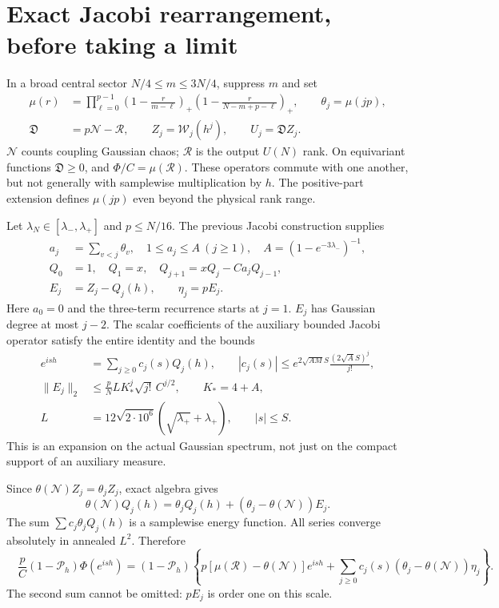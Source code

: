 \documentclass[11pt]{article}
\newcommand{\NN}{\mathcal N}
\newcommand{\RR}{\mathcal R}
\newcommand{\DD}{\mathfrak D}
\newcommand{\WW}{\mathcal W}
\newcommand{\PP}{\mathcal P_h}
\newcommand{\thN}{\theta(\NN)}
\begin{document}
\section{Exact Jacobi rearrangement, before taking a limit}
In a broad central sector $N/4\le m\le3N/4$, suppress $m$ and set
\begin{align}
 \mu(r)&=\prod_{\ell=0}^{p-1}
 \left(1-\frac r{m-\ell}\right)_+
 \left(1-\frac r{N-m+p-\ell}\right)_+,\qquad \theta_j=\mu(jp),\\
 \DD&=p\NN-\RR,\qquad Z_j=\WW_j(h^j),\qquad U_j=\DD Z_j.
\end{align}
$\NN$ counts coupling Gaussian chaos; $\RR$ is the output $U(N)$
rank. On equivariant functions $\DD\ge0$, and $\Phi/C=\mu(\RR)$.
These operators commute with one another, but not generally with
samplewise multiplication by $h$. The positive-part extension defines
$\mu(jp)$ even beyond the physical rank range.

Let $\lambda_N\in[\lambda_-,\lambda_+]$ and $p\le N/16$. The previous
Jacobi construction \cite{Uniform} supplies
\begin{align}
 a_j&=\sum_{v<j}\theta_v,\quad 1\le a_j\le A\ (j\ge1),
 \quad A=(1-e^{-3\lambda_-})^{-1},\\
 Q_0&=1,\quad Q_1=x,\quad Q_{j+1}=xQ_j-Ca_jQ_{j-1},\\
 E_j&=Z_j-Q_j(h),\qquad \eta_j=pE_j.
\end{align}
Here $a_0=0$ and the three-term recurrence starts at $j=1$.
$E_j$ has Gaussian degree at most $j-2$. The scalar coefficients of
the auxiliary bounded Jacobi operator satisfy the entire identity
and the bounds
\begin{align}
 e^{is h}&=\sum_{j\ge0}c_j(s)Q_j(h),\qquad
 |c_j(s)|\le e^{2\sqrt{AM}S}\frac{(2\sqrt A S)^j}{j!},\label{eq:c}\\
 \|E_j\|_2&\le\frac pN L K_*^j\sqrt{j!}\,C^{j/2},\qquad
 K_*=4+A,\label{eq:E}\\
 L&=12\sqrt{2\cdot10^6}(\sqrt{\lambda_+}+\lambda_+),\qquad |s|\le S.
\end{align}
This is an expansion on the actual Gaussian spectrum, not just on
the compact support of an auxiliary measure.

Since $\thN Z_j=\theta_jZ_j$, exact algebra gives
\begin{equation}
 \thN Q_j(h)=\theta_jQ_j(h)+(\theta_j-\thN)E_j.
\end{equation}
The sum $\sum c_j\theta_jQ_j(h)$ is a samplewise energy function.
All series converge absolutely in annealed $L^2$. Therefore
\begin{equation}
 \boxed{\quad
 \frac pC(1-\PP)\Phi(e^{ish})=(1-\PP)
 \left\{p[\mu(\RR)-\thN]e^{ish}
 +\sum_{j\ge0}c_j(s)(\theta_j-\thN)\eta_j\right\}.
 \quad}\label{eq:exact}
\end{equation}
The second sum cannot be omitted: $pE_j$ is order one on this scale.
\end{document}
